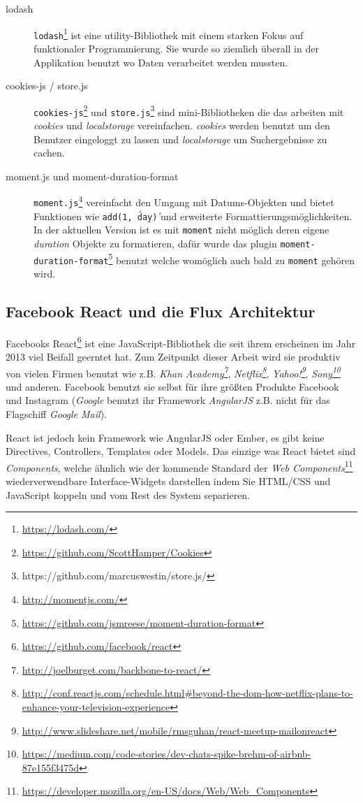 \documentclass[12pt,twoside]{book}
\begin{document}
\begin{description}
	\item[lodash]
		\texttt{lodash}\footnote{\url{https://lodash.com/}} ist eine utility-Bibliothek mit einem starken Fokus auf funktionaler Programmierung. Sie wurde so ziemlich überall in der Applikation benutzt wo Daten verarbeitet werden mussten.
	\item[cookies-js / store.js]
		\texttt{cookies-js}\footnote{\url{https://github.com/ScottHamper/Cookies}} und \texttt{store.js}\footnote{https://github.com/marcuswestin/store.js/} sind mini-Bibliotheken die das arbeiten mit \textit{cookies} und \textit{localstorage} vereinfachen. \textit{cookies} werden benutzt um den Benutzer eingeloggt zu lassen und \textit{localstorage} um Suchergebnisse zu cachen.
	\item[moment.js und  moment-duration-format]
		\texttt{moment.js}\footnote{\url{http://momentjs.com/}} vereinfacht den Umgang mit Datums-Objekten und bietet Funktionen wie \texttt{add(1, \'day\')} und erweiterte Formattierungsmöglichkeiten. In der aktuellen Version ist es mit \texttt{moment} nicht möglich deren eigene \textit{duration} Objekte zu formatieren, dafür wurde das plugin \texttt{moment-duration-format}\footnote{\url{https://github.com/jsmreese/moment-duration-format}} benutzt welche womöglich auch bald zu \texttt{moment} gehören wird.
\end{description}


\subsection{Facebook React und die Flux Architektur}

Facebooks React\footnote{\url{https://github.com/facebook/react}} ist eine JavaScript-Bibliothek die seit ihrem erscheinen im Jahr 2013 viel Beifall geerntet hat. Zum Zeitpunkt dieser Arbeit wird sie produktiv von vielen Firmen benutzt wie z.B. \textit{Khan Academy\footnote{\url{http://joelburget.com/backbone-to-react/}}}, \textit{Netflix\footnote{\url{http://conf.reactjs.com/schedule.html\#beyond-the-dom-how-netflix-plans-to-enhance-your-television-experience}}}, \textit{Yahoo!\footnote{\url{http://www.slideshare.net/mobile/rmsguhan/react-meetup-mailonreact}}}, \textit{Sony\footnote{\url{https://medium.com/code-stories/dev-chats-spike-brehm-of-airbnb-87e155f3475d}}} und anderen. Facebook benutzt sie selbst für ihre größten Produkte Facebook und Instagram (\textit{Google} benutzt ihr Framework \textit{AngularJS} z.B. nicht für das Flagschiff \textit{Google Mail}).

React ist jedoch kein Framework wie AngularJS oder Ember, es gibt keine Directives, Controllers, Templates oder Models. Das einzige was React bietet sind \textit{Components}, welche ähnlich wie der kommende Standard der \textit{Web Components}\footnote{\url{https://developer.mozilla.org/en-US/docs/Web/Web_Components}} wiederverwendbare Interface-Widgets darstellen indem Sie HTML/CSS und JavaScript koppeln und vom Rest des System separieren.
\end{document}
